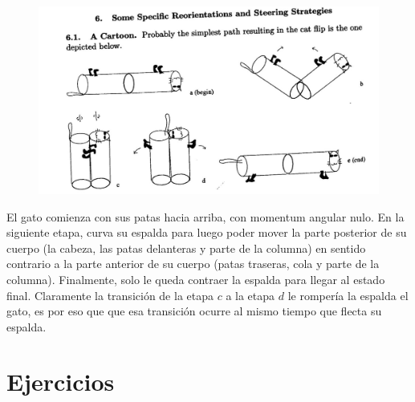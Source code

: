 \documentclass[letterpaper]{article}
\begin{document}
\begin{figure}[h]
\centering
\includegraphics[scale=0.3]{cat.jpg}
\end{figure}

El gato comienza con sus patas hacia arriba, con momentum angular nulo. En la siguiente etapa, curva su espalda para luego poder mover la parte posterior de su cuerpo (la cabeza, las patas delanteras y parte de la columna) en sentido contrario a la parte anterior de su cuerpo (patas traseras, cola y parte de la columna). Finalmente, solo le queda contraer la espalda para llegar al estado final. Claramente la transición de la etapa $c$ a la etapa $d$ le rompería la espalda el gato, es por eso que que esa transición ocurre al mismo tiempo que flecta su espalda.

\section*{Ejercicios}
\end{document}
